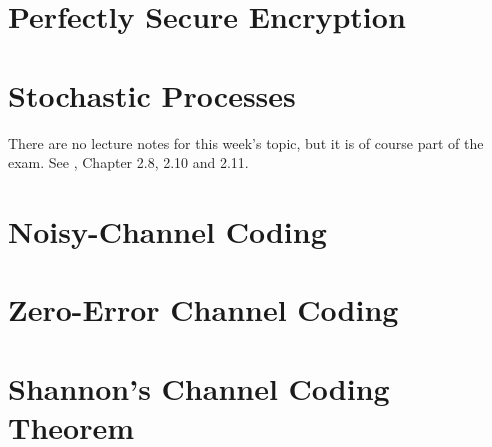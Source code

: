 \documentclass[11pt,fleqn]{book} %
\begin{document}
\chapter{Perfectly Secure Encryption}


\chapter{Stochastic Processes}
There are no lecture notes for this week's topic, but it is of course part of the exam. See \CT, Chapter 2.8, 2.10 and 2.11.


\chapter{Noisy-Channel Coding}


\chapter{Zero-Error Channel Coding}


\chapter{Shannon's Channel Coding Theorem}


\end{document}
